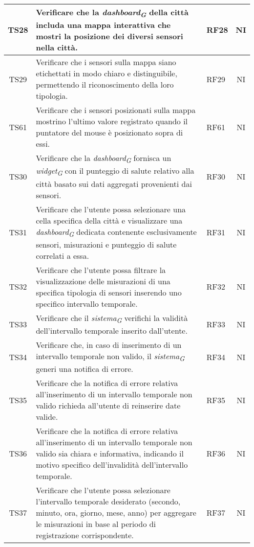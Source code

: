 \begin{longtable}{|c|p{5cm}|>{\raggedright}p{2cm}|c|}
        \hline
        TS28 & Verificare che la \textit{dashboard}\textsubscript{\textit{G}} della città includa una mappa interattiva che mostri la posizione dei diversi sensori nella città. & RF28 & NI \\
        \hline
        TS29 & Verificare che i sensori sulla mappa siano etichettati in modo chiaro e distinguibile, permettendo il riconoscimento della loro tipologia. & RF29 & NI \\
        \hline
        TS61 & Verificare che i sensori posizionati sulla mappa mostrino l'ultimo valore registrato quando il puntatore del mouse è posizionato sopra di essi. & RF61 & NI \\
        \hline
        TS30 & Verificare che la \textit{dashboard}\textsubscript{\textit{G}} fornisca un \textit{widget}\textsubscript{\textit{G}} con il punteggio di salute relativo alla città basato sui dati aggregati provenienti dai sensori. & RF30 & NI \\
        \hline
        TS31 & Verificare che l'utente possa selezionare una cella specifica della città e visualizzare una \textit{dashboard}\textsubscript{\textit{G}} dedicata contenente esclusivamente sensori, misurazioni e punteggio di salute correlati a essa. & RF31 & NI \\
        \hline
        TS32 & Verificare che l'utente possa filtrare la visualizzazione delle misurazioni di una specifica tipologia di sensori inserendo uno specifico intervallo temporale. & RF32 & NI \\
        \hline
        TS33 & Verificare che il \textit{sistema}\textsubscript{\textit{G}} verifichi la validità dell'intervallo temporale inserito dall'utente. & RF33 & NI \\
        \hline
        TS34 & Verificare che, in caso di inserimento di un intervallo temporale non valido, il \textit{sistema}\textsubscript{\textit{G}} generi una notifica di errore. & RF34 & NI \\
        \hline
        TS35 & Verificare che la notifica di errore relativa all'inserimento di un intervallo temporale non valido richieda all'utente di reinserire date valide. & RF35 & NI \\
        \hline
        TS36 & Verificare che la notifica di errore relativa all'inserimento di un intervallo temporale non valido sia chiara e informativa, indicando il motivo specifico dell'invalidità dell'intervallo temporale. & RF36 & NI \\
        \hline
        TS37 & Verificare che l'utente possa selezionare l'intervallo temporale desiderato (secondo, minuto, ora, giorno, mese, anno) per aggregare le misurazioni in base al periodo di registrazione corrispondente. & RF37 & NI \\

\end{longtable}
